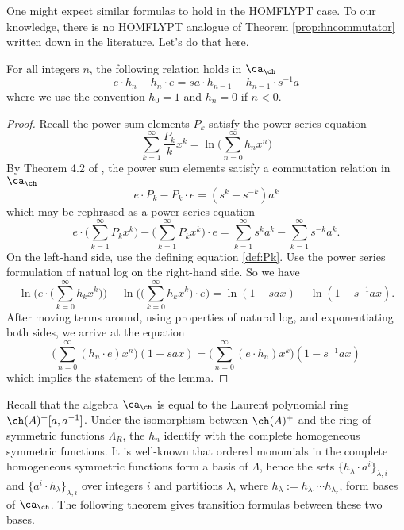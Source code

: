 One might expect similar formulas to hold in the HOMFLYPT case. To our knowledge, there is no HOMFLYPT analogue of Theorem \ref{prop:hncommutator} written down in the literature. Let's do that here. 

\begin{lemma} \label{lem:homfly1}
For all integers $n$, the following relation holds in $\ca_\ch$
\begin{equation}
e \cdot h_n - h_n \cdot e = s a \cdot h_{n-1} - h_{n-1} \cdot  s^{-1} a
\end{equation}
where we use the convention $h_0 = 1$ and $h_n = 0$ if $n < 0$. 
\end{lemma}
\begin{proof}
Recall the power sum elements $P_k$ satisfy the power series equation
\begin{equation} \label{def:Pk}
\sum_{k=1}^\infty \frac{P_k}{k} x^k = \ln \Big( \sum_{n=0}^\infty h_n x^n \Big)
\end{equation}
By Theorem 4.2 of \cite{Mor02b}, the power sum elements satisfy a commutation relation in $\ca_\ch$
\begin{equation}
e \cdot P_k - P_k \cdot e = (s^{k} - s^{-k}) a^k
\end{equation} 
which may be rephrased as a power series equation 
\[
e \cdot \Big( \sum_{k=1}^\infty P_k x^k \Big) - \Big( \sum_{k=1}^\infty P_k x^k \Big) \cdot e = \sum_{k=1}^\infty s^k a^k - \sum_{k=1}^\infty s^{-k} a^k.
\]
On the left-hand side, use the defining equation \eqref{def:Pk}. Use the power series formulation of natual log on the right-hand side. So we have
\[
\ln \Bigg( e \cdot \Big( \sum_{k=0}^\infty h_k x^k \Big) \Bigg) - \ln \Bigg( \Big( \sum_{k=0}^\infty h_k x^k \Big) \cdot e \Bigg) = \ln ( 1 - s a x ) - \ln ( 1 - s^{-1} a x ).
\]
After moving terms around, using properties of natural log, and exponentiating both sides, we arrive at the equation
\[
\Big( \sum_{n=0}^\infty (h_n \cdot e ) x^n \Big) ( 1 - s a x ) = \Big( \sum_{n=0}^\infty ( e \cdot h_n ) x^k \Big) ( 1 - s^{-1} a x )
\]
which implies the statement of the lemma.
\end{proof}

Recall that the algebra $\ca_\ch$ is equal to the Laurent polynomial ring $\ch(A)^+[a, a^{-1}]$. Under the isomorphism between $\ch(A)^+$ and the ring of symmetric functions $\Lambda_R$, the $h_n$ identify with the complete homogeneous symmetric functions. It is well-known that ordered monomials in the complete homogeneous symmetric functions form a basis of $\Lambda$, hence the sets $\{h_\lambda \cdot a^i \}_{\lambda, i}$ and $\{a^i \cdot h_\lambda \}_{\lambda, i}$ over integers $i$ and partitions $\lambda$, where $h_\lambda := h_{\lambda_1} \cdots h_{\lambda_r}$, form bases of $\ca_\ch$. The following theorem gives transition formulas between these two bases. 

